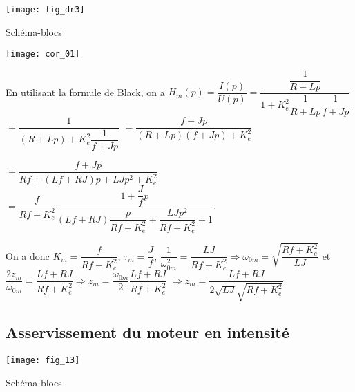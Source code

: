 \ifprof
\else
\begin{marginfigure}
\centering
\texttt{[image: fig\_dr3]}
\caption{Schéma-blocs \label{fig_dr3}}
\end{marginfigure}
\fi


\ifprof
\begin{corrige}
\begin{center}
\texttt{[image: cor\_01]}
\end{center}
\end{corrige}
\else
\fi


\ifprof
\begin{corrige}
En utilisant la formule de Black, on a 
$H_m(p)=\dfrac{I(p)}{U(p)} = \dfrac{\dfrac{1}{R+Lp}}{1+K_e^2 \dfrac{1}{R+Lp} \dfrac{1}{f+Jp}}$
$ = \dfrac{1}{\left(R+Lp\right)+K_e^2 \dfrac{1}{f+Jp}}$
$ = \dfrac{f+Jp}{\left(R+Lp\right)\left(f+Jp\right)+K_e^2 }$

$ = \dfrac{f+Jp}{Rf+\left(Lf + RJ\right)p+LJp^2 +K_e^2 }$
$ = \dfrac{f}{Rf+K_e^2} \dfrac{1+\dfrac{J}{f}p}{\left(Lf + RJ\right)\dfrac{p}{Rf+K_e^2}+\dfrac{LJp^2}{Rf+K_e^2}+1 }$.

On a donc $K_m = \dfrac{f}{Rf+K_e^2}$, $\tau_m=\dfrac{J}{f}$, 
$\dfrac{1}{\omega_{0m}^2} = \dfrac{LJ}{Rf+K_e^2} \Rightarrow \omega_{0m} = \sqrt{\dfrac{Rf+K_e^2}{LJ}} $
et $ \dfrac{2z_m}{\omega_{0m}} = \dfrac{Lf + RJ}{Rf+K_e^2} \Rightarrow z_m = \dfrac{\omega_{0m}}{2}\dfrac{Lf + RJ}{Rf+K_e^2}$
$\Rightarrow z_m = \dfrac{Lf + RJ}{2\sqrt{LJ}\sqrt{Rf+K_e^2}}$.

\end{corrige}
\else
\fi


\subsection*{Asservissement du moteur en intensité}
\ifprof
\else

\begin{marginfigure}
\centering
\texttt{[image: fig\_13]}
\caption{Schéma-blocs \label{fig_13}}
\end{marginfigure}

